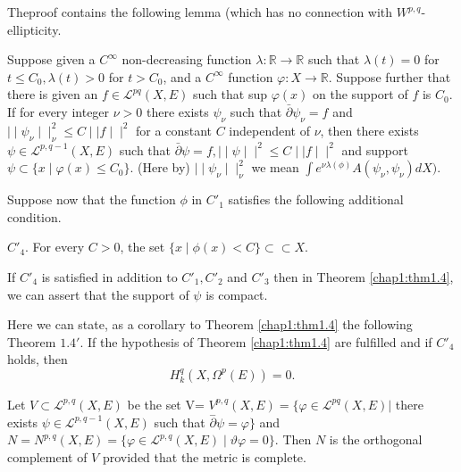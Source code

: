 \begin{remark*}
  The\pageoriginale proof contains the following lemma (which has no
  connection with $W^{p,q}$-ellipticity.  
\end{remark*}

\begin{lemma}\label{chap1:lem1.7}%
  Suppose given a $C^{\infty} $  non-decreasing function  $
  \lambda:\mathbb{R} \rightarrow \mathbb{R} $    
  such that $\lambda (t) = 0$ for $t\leq C_{0} ,  \lambda (t) >0$
   for $t  >  C_{0}$, and a $C^{\infty}$ function $\varphi :
  X \rightarrow \mathbb{R}$. Suppose further that  there is given an   
  $f \in \mathcal{L}^{pq} (X,E)$  such that sup  $ \varphi (x)$ on the
support of $f$ is $C_{0}$. If for every integer $\nu > 0$ 
there exists  $\psi_{\nu}$   such that  $\bar{\partial} \psi_{\nu} =
f$ and $\mid\mid \psi_\nu  \mid\mid^{2}_{\nu} \leq C \mid\mid f \mid\mid^{2}$
for a constant $C$ independent of  $\nu$, then there  exists  $ \psi \in
\mathcal{L}^{p,q-1}(X,E) $  such that $ \bar{\partial} \psi = f,
\mid\mid \psi \mid\mid^{2} \leq C \mid\mid f \mid\mid^{2} $ and  
support $ \psi \subset \{x \mid \varphi (x) \leq C_{0} \}$. (Here by)
$\mid\mid \psi_{\nu} \mid\mid^{2}_{\nu} $   
we  mean  $ \int e ^{\nu \lambda (\phi)} A (\psi_{\nu},\psi_{\nu})
dX)$.
\end{lemma}

Suppose now that the function  $\phi$ in $C'_{1}$  satisfies the
following additional condition. 

$C'_{4}$.  For every  $ C > 0$, the set  $ \{ x \mid \phi(x) < C\}
\subset \subset X$. 

\begin{remark*}
  If  $C'_{4}$ is  satisfied in addition to $C'_{1}, C'_{2}$ and
  $C'_{3}$ then in Theorem \ref{chap1:thm1.4}, we can assert that the support
  of  $\psi$ is compact. 
\end{remark*}

Here we can state, as a corollary to Theorem \ref{chap1:thm1.4} the following 
Theorem {$1.4'$}. If the hypothesis  of Theorem  \ref{chap1:thm1.4}
are fulfilled and 
if $C'_{4}$ holds, then 
$$ 
H^q_{k} (X,\Omega ^{p} (E))=0.
$$

\begin{lemma}%
  Let $ V \subset \mathcal{L}^{p,q} (X,E)$ be the set V=
  $V^{p,q}(X,E)=   \{ \varphi  \in \mathcal{L}^{pq}(X,E) \bigg|$ 
  there exists $ \psi \in \mathcal{L}^{p,q-1}(X,E) $  such that  $
  \overset{-}{\partial} \psi = \varphi \}$ 
  and\pageoriginale $N =N^{p,q}(X,E) = \{\varphi \in
  \mathcal{L}^{p,q}(X,E)\mid  \vartheta \varphi =0 \}$.  
  Then  $N$ is the orthogonal complement of $V$ provided that the metric
  is complete. 
\end{lemma}


